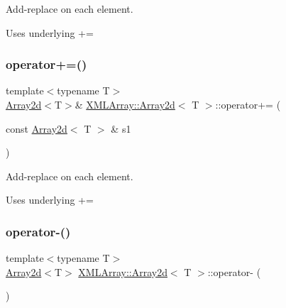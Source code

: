 Add-\/replace on each element. 

Uses underlying += \mbox{\label{classXMLArray_1_1Array2d_a1e4469713c271b4d9c02ac881cdf00dd}} 
\subsubsection{\texorpdfstring{operator+=()}{operator+=()}\hspace{0.1cm}{\footnotesize\ttfamily [2/2]}}
{\footnotesize\ttfamily template$<$typename T$>$ \\
\mbox{\hyperlink{classXMLArray_1_1Array2d}{Array2d}}$<$T$>$\& \mbox{\hyperlink{classXMLArray_1_1Array2d}{X\+M\+L\+Array\+::\+Array2d}}$<$ T $>$\+::operator+= (\begin{DoxyParamCaption}\item[{const \mbox{\hyperlink{classXMLArray_1_1Array2d}{Array2d}}$<$ T $>$ \&}]{s1 }\end{DoxyParamCaption})\hspace{0.3cm}{\ttfamily [inline]}}



Add-\/replace on each element. 

Uses underlying += \mbox{\label{classXMLArray_1_1Array2d_a650034573254ebdd7c914d68a498e2c9}} 
\subsubsection{\texorpdfstring{operator-\/()}{operator-()}\hspace{0.1cm}{\footnotesize\ttfamily [1/2]}}
{\footnotesize\ttfamily template$<$typename T$>$ \\
\mbox{\hyperlink{classXMLArray_1_1Array2d}{Array2d}}$<$T$>$ \mbox{\hyperlink{classXMLArray_1_1Array2d}{X\+M\+L\+Array\+::\+Array2d}}$<$ T $>$\+::operator-\/ (\begin{DoxyParamCaption}{ }\end{DoxyParamCaption})\hspace{0.3cm}{\ttfamily [inline]}}



